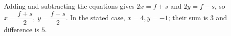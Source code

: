 Adding and subtracting the equations gives $2x=f+s$ and $2y=f-s$, so $\boxed{x=\dfrac{f+s}{2},\ y=\dfrac{f-s}{2}}$. In the stated case, $\boxed{x=4,y=-1}$; their sum is $3$ and difference is $5$.
